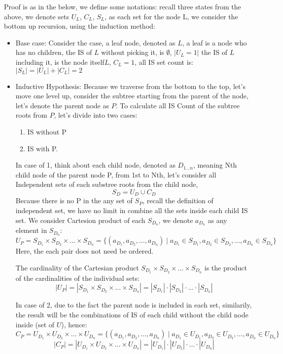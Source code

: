 \documentclass{article}
\begin{document}
Proof is as in the below, we define some notations: recall three states from the above, we denote sets $U_{L}$, $C_{L}$, $S_{L}$, as each set for the node L, we consider the bottom up recursion, using the induction method:
\begin{itemize}
  \item Base case: Consider the case, a leaf node, denoted as $L$, a leaf is a node who has no children, the IS of $L$ without picking it, is $\emptyset$, $|U_{L}=1|$  the IS of $L$ including it, is the node itself${L}$, $C_{L}=1$, all IS set count is: $|S_{L}| = |U_{L}| + |C_{L}| = 2$ 
  \item Inductive Hypothesis: Because we traverse from the bottom to the top, let's move one level up, consider the subtree starting from the parent of the node, let's denote the parent node as $P$. To calculate all IS Count of the subtree roots from $P$, let's divide into two cases: 
    \begin{enumerate}
      \item IS without P
      \item IS with P. 
    \end{enumerate}

    In case of 1, think about each child node, denoted as $D_{1...n}$, meaning Nth child node of the parent node P, from 1st to Nth,
    let's consider all Independent sets of each substree roots from the child node, 
    \[ S_{D} =  U_{D} \cup C_{D} \tag{$*$} \] 
    Because there is no P in the any set of $S_{P}$, recall the definition of independent set, we have no limit in combine all the sets inside each child IS set.
    We consider Cartesion product of each $S_{D_n}$, we denote $a_{D_n}$ as any element in $S_{D_n}$:
    \[ U_P =  S_{D_1} \times S_{D_2} \times \ldots \times S_{D_n} = \{(a_{D_1}, a_{D_2}, \ldots, a_{D_n}) \mid a_{D_1} \in S_{D_1}, a_{D_2} \in S_{D_2}, \ldots, a_{D_n} \in S_{D_n}\} \]
    Here, the each pair does not need be ordered.

    The cardinality of the Cartesian product $S_{D_1} \times S_{D_2} \times \ldots \times S_{D_n}$ is the product of the cardinalities of the individual sets:
    \[|U_P| =|S_{D_1} \times S_{D_2} \times \ldots \times S_{D_n}| = |S_{D_1}| \cdot |S_{D_2}| \cdot \ldots \cdot |S_{D_n}| \]

    In case of 2, due to the fact the parent node is included in each set, similarily, 
    the result will be the combinations of IS of each child without the child node inside (set of $U$), hence:
    \[ C_P =  U_{D_1} \times U_{D_2} \times \ldots \times U_{D_n} = \{(a_{D_1}, a_{D_2}, \ldots, a_{D_n}) \mid a_{D_1} \in U_{D_1}, a_{D_2} \in U_{D_2}, \ldots, a_{D_n} \in U_{D_n}\} \]
    \[|C_P| =|U_{D_1} \times U_{D_2} \times \ldots \times U_{D_n}| = |U_{D_1}| \cdot |U_{D_2}| \cdot \ldots \cdot |U_{D_n}| \]


\end{itemize}
\end{document}
